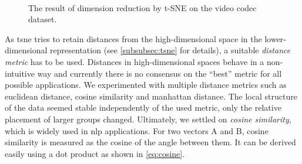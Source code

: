\begin{figure}[!]
    \centering
    \\
    \caption{The result of dimension reduction by t-SNE on the video codec dataset.}
    \label{fig:tsne_video_codec_double}
\end{figure}

As \gls{tsne} tries to retain distances from the high-dimensional space in the lower-dimensional representation (see \autoref{subsubsec:tsne} for details), a suitable \textit{distance metric} has to be used.
Distances in high-dimensional spaces behave in a non-intuitive way and currently there is no consensus on the ``best'' metric for all possible applications.
We experimented with multiple distance metrics such as euclidean distance, cosine similarity and manhattan distance.
The local structure of the data seemed stable independently of the used metric, only the relative placement of larger groups changed.
Ultimately, we settled on \textit{cosine similarity}, which is widely used in \gls{nlp} applications.
For two vectors A and B, cosine similarity is measured as the cosine of the angle between them.
It can be derived easily using a dot product as shown in \autoref{eq:cosine}.

